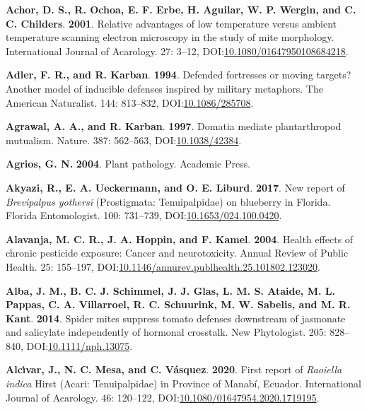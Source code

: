 \documentclass[12pt,final,CPage]{ufthesis}
\newlength{\cslhangindent}
\newenvironment{CSLReferences}[2] %
{%
	\setlength{\parindent}{0pt}
	\ifodd #1 \everypar{\setlength{\hangindent}{\cslhangindent}}\ignorespaces\fi
	\ifnum #2 > 0
	\setlength{\parskip}{#2\baselineskip}
	\fi
}%
{}
\begin{document}
{\begin{CSLReferences}{1}{0}
  \leavevmode{}%
  \textbf{Achor, D. S., R. Ochoa, E. F. Erbe, H. Aguilar, W. P. Wergin, and C. C. Childers}. \textbf{2001}. Relative advantages of low temperature versus ambient temperature scanning electron microscopy in the study of mite morphology. International Journal of Acarology. 27: 3--12, DOI:\href{https://doi.org/10.1080/01647950108684218}{10.1080/01647950108684218}.

  \leavevmode{}%
  \textbf{Adler, F. R., and R. Karban}. \textbf{1994}. Defended fortresses or moving targets? Another model of inducible defenses inspired by military metaphors. The American Naturalist. 144: 813--832, DOI:\href{https://doi.org/10.1086/285708}{10.1086/285708}.

  \leavevmode{}%
  \textbf{Agrawal, A. A., and R. Karban}. \textbf{1997}. Domatia mediate plantarthropod mutualism. Nature. 387: 562--563, DOI:\href{https://doi.org/10.1038/42384}{10.1038/42384}.

  \leavevmode{}%
  \textbf{Agrios, G. N.} \textbf{2004}. Plant pathology. Academic Press.

  \leavevmode{}%
  \textbf{Akyazi, R., E. A. Ueckermann, and O. E. Liburd}. \textbf{2017}. New report of {\emph{Brevipalpus yothersi}} ({Prostigmata}: {Tenuipalpidae}) on blueberry in {Florida}. Florida Entomologist. 100: 731--739, DOI:\href{https://doi.org/10.1653/024.100.0420}{10.1653/024.100.0420}.

  \leavevmode{}%
  \textbf{Alavanja, M. C. R., J. A. Hoppin, and F. Kamel}. \textbf{2004}. Health effects of chronic pesticide exposure: Cancer and neurotoxicity. Annual Review of Public Health. 25: 155--197, DOI:\href{https://doi.org/10.1146/annurev.publhealth.25.101802.123020}{10.1146/annurev.publhealth.25.101802.123020}.

  \leavevmode{}%
  \textbf{Alba, J. M., B. C. J. Schimmel, J. J. Glas, L. M. S. Ataide, M. L. Pappas, C. A. Villarroel, R. C. Schuurink, M. W. Sabelis, and M. R. Kant}. \textbf{2014}. Spider mites suppress tomato defenses downstream of jasmonate and salicylate independently of hormonal crosstalk. New Phytologist. 205: 828--840, DOI:\href{https://doi.org/10.1111/nph.13075}{10.1111/nph.13075}.

  \leavevmode{}%
  \textbf{Alcı́var, J., N. C. Mesa, and C. Vásquez}. \textbf{2020}. First report of {\emph{Raoiella indica}} {Hirst} ({Acari}: {Tenuipalpidae}) in {Province} of {Manab{í}}, {Ecuador}. International Journal of Acarology. 46: 120--122, DOI:\href{https://doi.org/10.1080/01647954.2020.1719195}{10.1080/01647954.2020.1719195}.


\end{CSLReferences}}
\end{document}
